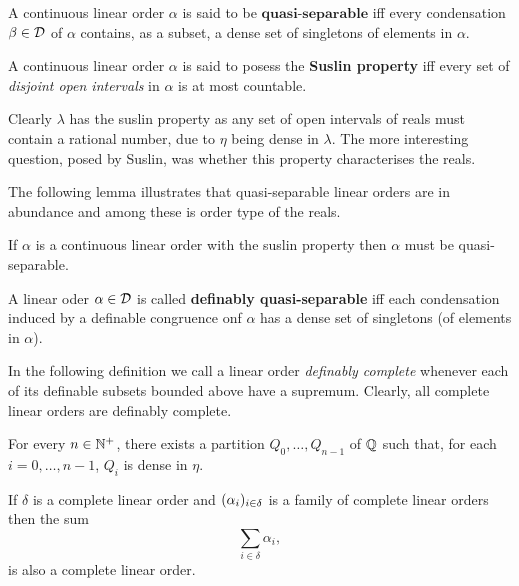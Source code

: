 \begin{dfn}
	A continuous linear order $\alpha$ is said to be $\textbf{quasi-separable}$ iff every condensation $\beta\in\mathcal{D}$ of $\alpha$ contains, as a subset, a dense set of singletons of elements in $\alpha$.
\end{dfn}

\begin{dfn}
	A continuous linear order $\alpha$ is said to posess the \textbf{Suslin property} iff every set of \textit{disjoint open intervals} in $\alpha$ is at most countable.
\end{dfn}

Clearly $\lambda$ has the suslin property as any set of open intervals of reals must contain a rational number, due to $\eta$ being dense in $\lambda$.  The more interesting question, posed by Suslin, was whether this property characterises the reals.

The following lemma illustrates that quasi-separable linear orders are in abundance and among these is order type of the reals.

\begin{prp}
	If $\alpha$ is a continuous linear order with the suslin property then $\alpha$ must be quasi-separable.
\end{prp}

\begin{dfn}
	A linear oder $\alpha\in\mathcal{D}$ is called \textbf{definably quasi-separable} iff each condensation induced by a definable congruence onf $\alpha$ has a dense set of singletons (of elements in $\alpha$).
\end{dfn}
In the following definition we call a linear order \textit{definably complete} whenever each of its definable subsets bounded above have a supremum.  Clearly, all complete linear orders are definably complete.

\begin{prp}\label{prp:qdense}
	For every $n\in\mathbb{N}^{+}$, there exists a partition $Q_0,\dotsc,Q_{n-1}$ of $\mathbb{Q}$ such that, for each $i=0,\dotsc,n-1$, $Q_i$ is dense in $\eta$.
\end{prp}

\begin{prp}\label{prp:csums}
	If $\delta$ is a complete linear order and $(\alpha_i)_{i\in\delta}$ is a family of complete linear orders then the sum
	\begin{equation}
		\sum_{i\in\delta}\alpha_i,
	\end{equation}
	is also a complete linear order.
\end{prp}

